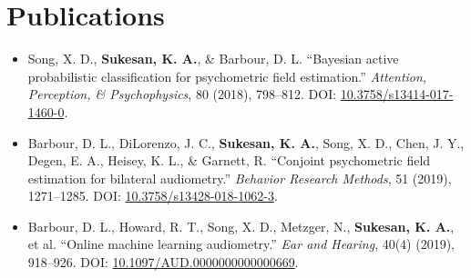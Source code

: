 \documentclass[10pt, letterpaper]{article}
\begin{document}
\section{Publications}
\begin{itemize}
  \item Song, X. D., \textbf{Sukesan, K. A.}, \& Barbour, D. L. ``Bayesian active probabilistic classification for psychometric field estimation.'' \textit{Attention, Perception, \& Psychophysics}, 80 (2018), 798--812. DOI: \href{https://doi.org/10.3758/s13414-017-1460-0}{10.3758/s13414-017-1460-0}.
  \item Barbour, D. L., DiLorenzo, J. C., \textbf{Sukesan, K. A.}, Song, X. D., Chen, J. Y., Degen, E. A., Heisey, K. L., \& Garnett, R. ``Conjoint psychometric field estimation for bilateral audiometry.'' \textit{Behavior Research Methods}, 51 (2019), 1271--1285. DOI: \href{https://doi.org/10.3758/s13428-018-1062-3}{10.3758/s13428-018-1062-3}.
  \item Barbour, D. L., Howard, R. T., Song, X. D., Metzger, N., \textbf{Sukesan, K. A.}, et al. ``Online machine learning audiometry.'' \textit{Ear and Hearing}, 40(4) (2019), 918--926. DOI: \href{https://doi.org/10.1097/AUD.0000000000000669}{10.1097/AUD.0000000000000669}.
\end{itemize}
\end{document}
